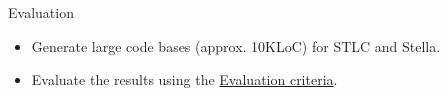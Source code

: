 \documentclass[serif, aspectratio=169]{beamer}
\begin{document}
\begin{frame}{Evaluation}
	\begin{itemize}
		\item Generate large code bases (approx. 10KLoC) for STLC and Stella.
		\item Evaluate the results using the \hyperlink{sec:evaluation_criteria}{Evaluation criteria}.
	\end{itemize}

\end{frame}








\end{document}
